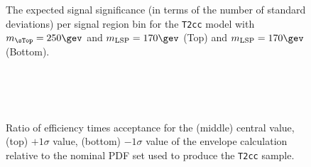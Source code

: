 \begin{figure}[h!]
  \begin{center}
     \\
     \\
    \caption{The expected signal significance (in terms of the number
      of standard deviations) per signal region bin for the
      \texttt{T2cc} model with $m_{\sTop} = 250\gev$ and $m_{\rm LSP}
      = 170\gev$ (Top) and $m_{\rm LSP} = 170\gev$ (Bottom).}
    \label{fig:sms-t2cc-sig}
  \end{center}
\end{figure}

\begin{figure}[h!]
  \begin{center}
    \\
    \\
    \\  
    \caption{\label{fig:sms-pdf-t2cc}Ratio of efficiency times
      acceptance for the (middle) central value, (top) $+1\sigma$
      value, (bottom) $-1\sigma$ value of the envelope calculation
      relative to the nominal PDF set used to produce the
      \texttt{T2cc} sample. }
  \end{center}
\end{figure}

